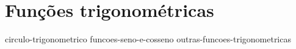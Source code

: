 \section{Funções trigonométricas}

{circulo-trigonometrico}
{funcoes-seno-e-cosseno}
{outras-funcoes-trigonometricas}